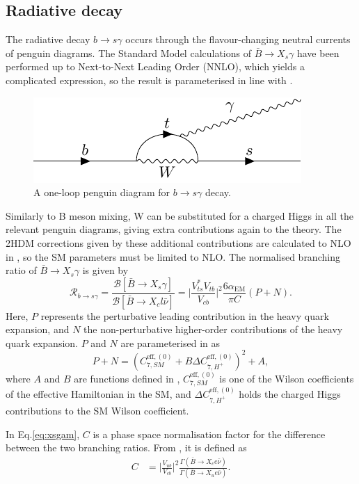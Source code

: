 \documentclass[a4paper,12pt]{article}
\begin{document}
\subsection{Radiative decay}
\label{subsec:rad}
The radiative decay $b\to s\gamma$ occurs through the flavour-changing neutral currents of penguin diagrams.
The Standard Model calculations of $\bar{B}\to X_s\gamma$ have been performed up to Next-to-Next Leading Order (NNLO), which yields a complicated expression, so the result is parameterised in line with \cite{a,b}.
\begin{figure}[H]
    \centering
    \includegraphics[scale=1.2]{bsgam.pdf}
    \caption{\label{fig:bsgam} A one-loop penguin diagram for $b\to s\gamma$ decay.}
\end{figure}
Similarly to B meson mixing, W can be substituted for a charged Higgs in all the relevant penguin diagrams, giving extra contributions again to the theory. 
The 2HDM corrections given by these additional contributions are calculated to NLO in \cite{b}, so the SM parameters must be limited to NLO.
The normalised branching ratio of $\bar{B}\to X_s\gamma$ is given by
\begin{equation}
    \label{eq:xsgam}
    \mathcal{R}_{b\to s\gamma} = \frac{\mathcal{B}[\bar{B}\to X_s\gamma]}{\mathcal{B}[\bar{B}\to X_cl\bar{\nu}]} = \bigg|\frac{V_{ts}^*V_{tb}}{V_{cb}}\bigg|^2 \frac{6\alpha_{\text{EM}}}{\pi C}(P+N).
\end{equation}
Here, $P$ represents the perturbative leading contribution in the heavy quark expansion, and $N$ the non-perturbative higher-order contributions of the heavy quark expansion.
$P$ and $N$ are parameterised in \cite{a,b} as 
\begin{equation}
    \label{eq:pplsn}
    P+N = (C^{\text{eff},(0)}_{7,SM}+B\Delta C_{7,H^+}^{\text{eff},(0)})^2+A,
\end{equation}
where $A$ and $B$ are functions defined in \cite{a}, $C_{7,SM}^{\text{eff},(0)}$ is one of the Wilson coefficients of the effective Hamiltonian in the SM, and $\Delta C_{7,H^+}^{\text{eff},(0)}$ holds the charged Higgs contributions to the SM Wilson coefficient. 

In Eq.\eqref{eq:xsgam}, $C$ is a phase space normalisation factor for the difference between the two branching ratios. 
From \cite{f}, it is defined as 
\begin{align}
    \label{eq:phasespace}
    C &= \bigg|\frac{V_{ub}}{V_{cb}}\bigg|^2\frac{\Gamma(\bar{B}\to X_ce\bar{\nu})}{\Gamma(\bar{B}\to X_ue\bar{\nu})}.
\end{align}
\end{document}
